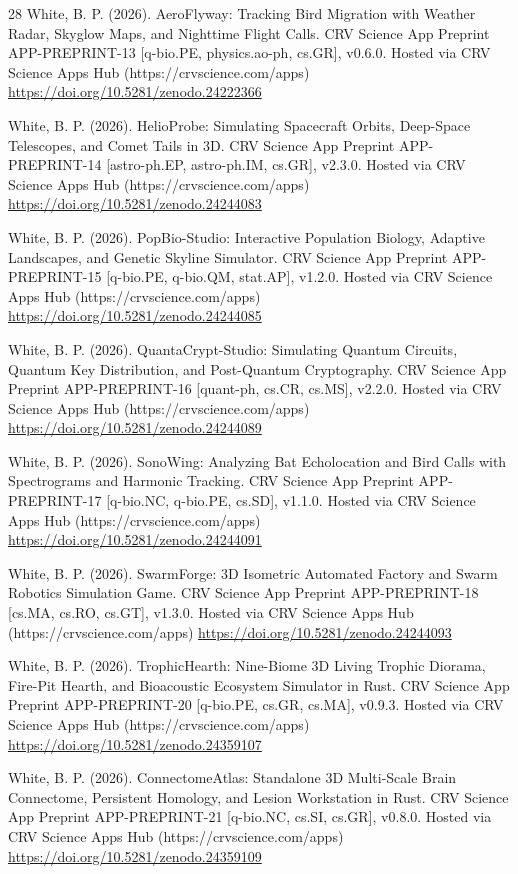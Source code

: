 \documentclass[10pt,letterpaper]{article}
\begin{document}
\begin{thebibliography}{28}
 White, B. P. (2026). AeroFlyway: Tracking Bird Migration with Weather Radar, Skyglow Maps, and Nighttime Flight Calls. CRV Science App Preprint APP-PREPRINT-13 [q-bio.PE, physics.ao-ph, cs.GR], v0.6.0. Hosted via CRV Science Apps Hub (https://crvscience.com/apps) \url{https://doi.org/10.5281/zenodo.24222366}

 White, B. P. (2026). HelioProbe: Simulating Spacecraft Orbits, Deep-Space Telescopes, and Comet Tails in 3D. CRV Science App Preprint APP-PREPRINT-14 [astro-ph.EP, astro-ph.IM, cs.GR], v2.3.0. Hosted via CRV Science Apps Hub (https://crvscience.com/apps) \url{https://doi.org/10.5281/zenodo.24244083}

 White, B. P. (2026). PopBio-Studio: Interactive Population Biology, Adaptive Landscapes, and Genetic Skyline Simulator. CRV Science App Preprint APP-PREPRINT-15 [q-bio.PE, q-bio.QM, stat.AP], v1.2.0. Hosted via CRV Science Apps Hub (https://crvscience.com/apps) \url{https://doi.org/10.5281/zenodo.24244085}

 White, B. P. (2026). QuantaCrypt-Studio: Simulating Quantum Circuits, Quantum Key Distribution, and Post-Quantum Cryptography. CRV Science App Preprint APP-PREPRINT-16 [quant-ph, cs.CR, cs.MS], v2.2.0. Hosted via CRV Science Apps Hub (https://crvscience.com/apps) \url{https://doi.org/10.5281/zenodo.24244089}

 White, B. P. (2026). SonoWing: Analyzing Bat Echolocation and Bird Calls with Spectrograms and Harmonic Tracking. CRV Science App Preprint APP-PREPRINT-17 [q-bio.NC, q-bio.PE, cs.SD], v1.1.0. Hosted via CRV Science Apps Hub (https://crvscience.com/apps) \url{https://doi.org/10.5281/zenodo.24244091}

 White, B. P. (2026). SwarmForge: 3D Isometric Automated Factory and Swarm Robotics Simulation Game. CRV Science App Preprint APP-PREPRINT-18 [cs.MA, cs.RO, cs.GT], v1.3.0. Hosted via CRV Science Apps Hub (https://crvscience.com/apps) \url{https://doi.org/10.5281/zenodo.24244093}

 White, B. P. (2026). TrophicHearth: Nine-Biome 3D Living Trophic Diorama, Fire-Pit Hearth, and Bioacoustic Ecosystem Simulator in Rust. CRV Science App Preprint APP-PREPRINT-20 [q-bio.PE, cs.GR, cs.MA], v0.9.3. Hosted via CRV Science Apps Hub (https://crvscience.com/apps) \url{https://doi.org/10.5281/zenodo.24359107}

 White, B. P. (2026). ConnectomeAtlas: Standalone 3D Multi-Scale Brain Connectome, Persistent Homology, and Lesion Workstation in Rust. CRV Science App Preprint APP-PREPRINT-21 [q-bio.NC, cs.SI, cs.GR], v0.8.0. Hosted via CRV Science Apps Hub (https://crvscience.com/apps) \url{https://doi.org/10.5281/zenodo.24359109}


\end{thebibliography}
\end{document}

